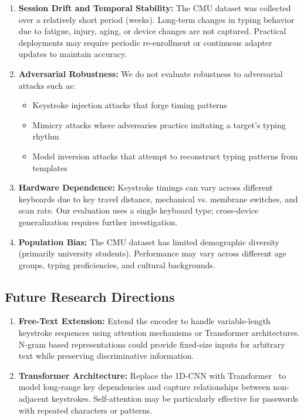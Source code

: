 \documentclass{ieeeaccess}
\begin{document}
{\begin{enumerate}
\item \textbf{Session Drift and Temporal Stability:} The CMU dataset was collected over a relatively short period (weeks). Long-term changes in typing behavior due to fatigue, injury, aging, or device changes are not captured. Practical deployments may require periodic re-enrollment or continuous adapter updates to maintain accuracy.

\item \textbf{Adversarial Robustness:} We do not evaluate robustness to adversarial attacks such as:
\begin{itemize}
\item Keystroke injection attacks that forge timing patterns
\item Mimicry attacks where adversaries practice imitating a target's typing rhythm
\item Model inversion attacks that attempt to reconstruct typing patterns from templates
\end{itemize}

\item \textbf{Hardware Dependence:} Keystroke timings can vary across different keyboards due to key travel distance, mechanical vs. membrane switches, and scan rate. Our evaluation uses a single keyboard type; cross-device generalization requires further investigation.

\item \textbf{Population Bias:} The CMU dataset has limited demographic diversity (primarily university students). Performance may vary across different age groups, typing proficiencies, and cultural backgrounds.
\end{enumerate}

\subsection{Future Research Directions}

\begin{enumerate}
\item \textbf{Free-Text Extension:} Extend the encoder to handle variable-length keystroke sequences using attention mechanisms or Transformer architectures. N-gram based representations could provide fixed-size inputs for arbitrary text while preserving discriminative information.

\item \textbf{Transformer Architecture:} Replace the 1D-CNN with Transformer~\cite{b33} to model long-range key dependencies and capture relationships between non-adjacent keystrokes. Self-attention may be particularly effective for passwords with repeated characters or patterns.


\end{enumerate}}
\end{document}
